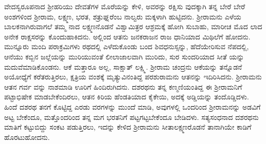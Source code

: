 ವೇದಸ್ವರೂಪನಾದ ಶ್ರೀಹರಿಯು ದೇವತೆಗಳ ಮೊರೆಯನ್ನು ಕೇಳಿ, ಅವರನ್ನು ರಕ್ಷಿಸು ವುದಕ್ಕಾಗಿ ತನ್ನ ಬೇರೆ ಬೇರೆ ಅಂಶಗಳಿಂದ ಶ್ರೀರಾಮ, ಲಕ್ಷ್ಮಣ, ಭರತ, ಶತ್ರುಘ್ನರೆಂಬ ನಾಲ್ವರು ಮಕ್ಕಳಾಗಿ ಹುಟ್ಟಿದನು. ಶ್ರೀರಾಮನು ಎಳೆಯ ಬಾಲಕನಾಗಿರುವಾಗಲೆ ತಮ್ಮ ನಾದ ಲಕ್ಷ್ಮಣನೊಡನೆ ವಿಶ್ವಾಮಿತ್ರರ ಆಶ್ರಮಕ್ಕೆ ಹೋಗಿ ಸುಬಾಹು, ಮಾರೀಚ ಮೊದ ಲಾದ ಅನೇಕ ರಾಕ್ಷಸರನ್ನು ಕೊಂದುಹಾಕಿದನು. ಅಲ್ಲಿಂದ ಆತನು ಜನಕರಾಜನ ರಾಜ ಧಾನಿಯಾದ ಮಿಥಿಲೆಗೆ ಹೋದನು. ಮುನ್ನೂರು ಮಂದಿ ಪರಾಕ್ರಮಿಗಳು ರಥದಲ್ಲಿ ಎಳೆದುಕೊಂಡು ಬಂದ ಶಿವಧನುಸ್ಸನ್ನು, ಹೆದೆಯೇರಿಸುವ ನೆಪದಲ್ಲಿ, ಆನೆಯು ಕಬ್ಬಿನ ಜಲ್ಲೆಯನ್ನು ಮುರಿಯುವಂತೆ ಲೀಲಾಜಾಲವಾಗಿ ಮುರಿದು, ಸುರ ಸುಂದರಿಯಾದ ಸೀತೆ ಯನ್ನು ಮದುವೆಮಾಡಿಕೊಂಡನು. ಆಕೆ ಮತ್ತಾರೂ ಅಲ್ಲ, ಸಾಕ್ಷಾತ್ ಲಕ್ಷ್ಮಿ. ಶ್ರೀರಾಮ ಚಂದ್ರನು ಆಕೆಯನ್ನು ತನ್ನೊಡನೆ ಅಯೋಧ್ಯೆಗೆ ಕರೆತರುತ್ತಿರಲು, ಕ್ಷತ್ರಿಯ ವಂಶಕ್ಕೆ ಮೃತ್ಯುವಿನಂತಿದ್ದ ಪರಶುರಾಮನು ಆತನನ್ನು ಇದಿರಿಸಿದನು. ಶ್ರೀರಾಮನು ಆತನ ಗರ್ವ ವನ್ನು ನಾಶಮಾಡಿ ಊರಿಗೆ ಹಿಂದಿರುಗಿದನು. ದಶರಥನು ತನ್ನ ಕಣ್ಮಣಿಯಂತಿದ್ದ ಈ ಶ್ರೀರಾಮನಿಗೆ ಪಟ್ಟಾಭಿಷೇಕ ಮಾಡಬೇಕೆಂದಿರಲು, ಆತನ ಕಿರಿಯ ಹೆಂಡತಿಯಾದ ಕೈಕೇಯಿ, ಅದಕ್ಕೆ ಅಡ್ಡಿಯನ್ನು ತಂದೊಡ್ಡಿದಳು. ಹಿಂದೆ ದಶರಥ ತನಗೆ ಕೊಟ್ಟಿದ್ದ ಎರಡು ವರಗಳನ್ನು ಮುಂದೆ ಮಾಡಿ, ಅವುಗಳಲ್ಲಿ ಒಂದರಿಂದ ಶ್ರೀರಾಮನನ್ನು ಅಡವಿಗೆ ಅಟ್ಟ ಬೇಕೆಂದೂ, ಮತ್ತೊಂದರಿಂದ ತನ್ನ ಮಗ ಭರತನಿಗೆ ಪಟ್ಟಗಟ್ಟಬೇಕೆಂದೂ ಬೇಡಿದಳು. ಸತ್ಯಸಂಧನಾದ ದಶರಥನು ಮಾತಿಗೆ ಕಟ್ಟುಬಿದ್ದು ಸಂಕಟ ಪಡುತ್ತಿರಲು, ಇದನ್ನು ಕೇಳಿದ ಶ್ರೀರಾಮನು ಸೀತಾಲಕ್ಷ್ಮಣರೊಡನೆ ತಾನಾಗಿಯೇ ಕಾಡಿಗೆ ಹೊರಟುಹೋದನು.

